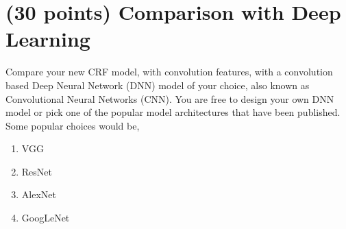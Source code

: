 \documentclass[11pt]{report}
\begin{document}
\section{(30 points) Comparison with Deep Learning}
\label{sec:Analysis}

Compare your new CRF model, with convolution features, with a convolution based
Deep Neural Network (DNN) model of your choice, also known as Convolutional
Neural Networks (CNN). You are free to design your own DNN model or pick one of
the popular model architectures that have been published. Some popular choices
would be,

\vspace{-0.5em}
\begin{enumerate}
\item VGG \cite{ZisSimZis14}
\item ResNet \cite{SunHeZhaRenetal15a}
\item AlexNet \cite{HinKriSutHin12a}
\item GoogLeNet \cite{SerSzeLiuJiaetal14}
\end{enumerate}
\vspace{-0.5em}
\end{document}
